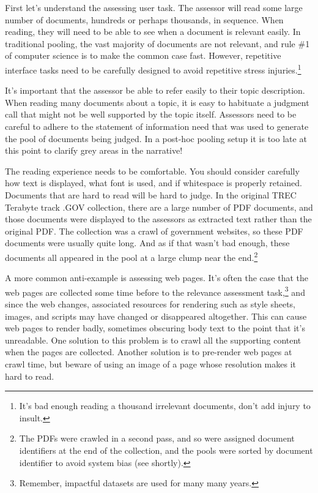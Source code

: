 \documentclass[nobib]{tufte-book}
\begin{document}
First let's understand the assessing user task.  The assessor will read some large number of documents, hundreds or perhaps thousands, in sequence.  When reading, they will need to be able to see when a document is relevant easily.  In traditional pooling, the vast majority of documents are not relevant, and rule \#1 of computer science is to make the common case fast.  However, repetitive interface tasks need to be carefully designed to avoid repetitive stress injuries.\footnote{It's bad enough reading a thousand irrelevant documents, don't add injury to insult.}

It's important that the assessor be able to refer easily to their topic description.  When reading many documents about a topic, it is easy to habituate a judgment call that might not be well supported by the topic itself.  Assessors need to be careful to adhere to the statement of information need that was used to generate the pool of documents being judged.  In a post-hoc pooling setup it is too late at this point to clarify grey areas in the narrative!

The reading experience needs to be comfortable.  You should consider carefully how text is displayed, what font is used, and if whitespace is properly retained.  Documents that are hard to read will be hard to judge.  In the original TREC Terabyte track .GOV collection, there are a large number of PDF documents, and those documents were displayed to the assessors as extracted text rather than the original PDF.  The collection was a crawl of government websites, so these PDF documents were usually quite long.  And as if that wasn't bad enough, these documents all appeared in the pool at a large clump near the end.\footnote{The PDFs were crawled in a second pass, and so were assigned document identifiers at the end of the collection, and the pools were sorted by document identifier to avoid system bias (see shortly).}

A more common anti-example is assessing web pages.  It's often the case that the web pages are collected some time before to the relevance assessment task,\footnote{Remember, impactful datasets are used for many many years.} and since the web changes, associated resources for rendering such as style sheets, images, and scripts may have changed or disappeared altogether.  This can cause web pages to render badly, sometimes obscuring body text to the point that it's unreadable.  One solution to this problem is to crawl all the supporting content when the pages are collected.  Another solution is to pre-render web pages at crawl time, but beware of using an image of a page whose resolution makes it hard to read.
\end{document}
